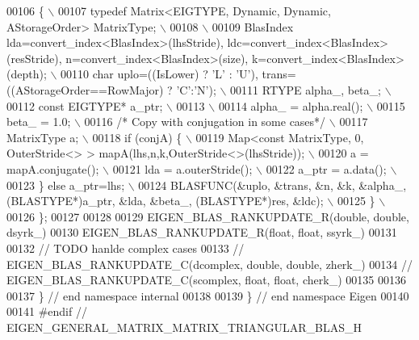 \begin{DoxyCode}
00106 \textcolor{preprocessor}{  \{ \(\backslash\)}
00107 \textcolor{preprocessor}{   typedef Matrix<EIGTYPE, Dynamic, Dynamic, AStorageOrder> MatrixType; \(\backslash\)}
00108 \textcolor{preprocessor}{\(\backslash\)}
00109 \textcolor{preprocessor}{   BlasIndex lda=convert\_index<BlasIndex>(lhsStride), ldc=convert\_index<BlasIndex>(resStride),
       n=convert\_index<BlasIndex>(size), k=convert\_index<BlasIndex>(depth); \(\backslash\)}
00110 \textcolor{preprocessor}{   char uplo=((IsLower) ? 'L' : 'U'), trans=((AStorageOrder==RowMajor) ? 'C':'N'); \(\backslash\)}
00111 \textcolor{preprocessor}{   RTYPE alpha\_, beta\_; \(\backslash\)}
00112 \textcolor{preprocessor}{   const EIGTYPE* a\_ptr; \(\backslash\)}
00113 \textcolor{preprocessor}{\(\backslash\)}
00114 \textcolor{preprocessor}{   alpha\_ = alpha.real(); \(\backslash\)}
00115 \textcolor{preprocessor}{   beta\_ = 1.0; \(\backslash\)}
00116 \textcolor{preprocessor}{}\textcolor{comment}{/* Copy with conjugation in some cases*/}\textcolor{preprocessor}{ \(\backslash\)}
00117 \textcolor{preprocessor}{   MatrixType a; \(\backslash\)}
00118 \textcolor{preprocessor}{   if (conjA) \{ \(\backslash\)}
00119 \textcolor{preprocessor}{     Map<const MatrixType, 0, OuterStride<> > mapA(lhs,n,k,OuterStride<>(lhsStride)); \(\backslash\)}
00120 \textcolor{preprocessor}{     a = mapA.conjugate(); \(\backslash\)}
00121 \textcolor{preprocessor}{     lda = a.outerStride(); \(\backslash\)}
00122 \textcolor{preprocessor}{     a\_ptr = a.data(); \(\backslash\)}
00123 \textcolor{preprocessor}{   \} else a\_ptr=lhs; \(\backslash\)}
00124 \textcolor{preprocessor}{   BLASFUNC(&uplo, &trans, &n, &k, &alpha\_, (BLASTYPE*)a\_ptr, &lda, &beta\_, (BLASTYPE*)res, &ldc); \(\backslash\)}
00125 \textcolor{preprocessor}{  \} \(\backslash\)}
00126 \textcolor{preprocessor}{\};}
00127 
00128 
00129 EIGEN\_BLAS\_RANKUPDATE\_R(\textcolor{keywordtype}{double}, \textcolor{keywordtype}{double}, dsyrk\_)
00130 EIGEN\_BLAS\_RANKUPDATE\_R(\textcolor{keywordtype}{float},  \textcolor{keywordtype}{float},  ssyrk\_)
00131 
00132 \textcolor{comment}{// TODO hanlde complex cases}
00133 \textcolor{comment}{// EIGEN\_BLAS\_RANKUPDATE\_C(dcomplex, double, double, zherk\_)}
00134 \textcolor{comment}{// EIGEN\_BLAS\_RANKUPDATE\_C(scomplex, float,  float, cherk\_)}
00135 
00136 
00137 \} \textcolor{comment}{// end namespace internal}
00138 
00139 \} \textcolor{comment}{// end namespace Eigen}
00140 
00141 \textcolor{preprocessor}{#endif // EIGEN\_GENERAL\_MATRIX\_MATRIX\_TRIANGULAR\_BLAS\_H}
\end{DoxyCode}
